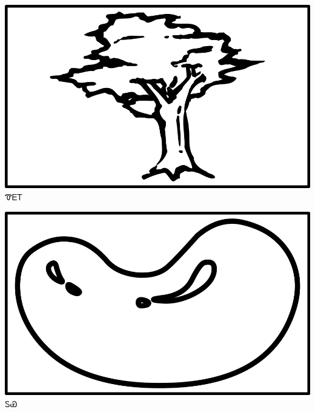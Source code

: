 \documentclass[avery5371]{flashcards}%
\begin{document}
    \begin{flashcard}{
        \includegraphics[width=0.95\columnwidth,height=.51\columnwidth,keepaspectratio]{../artwork/objects-rod/hlgv}
    }
        \Huge ᏡᎬᎢ
    \end{flashcard}

    \begin{flashcard}{
        \includegraphics[width=0.95\columnwidth,height=.51\columnwidth,keepaspectratio]{../artwork/objects-neutral/tuya}
    }
        \Huge ᏚᏯ
    \end{flashcard}
\end{document}
